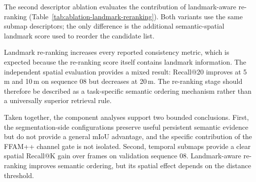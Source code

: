 The second descriptor ablation evaluates the contribution of landmark-aware re-ranking (Table~\ref{tab:ablation-landmark-reranking}). Both variants use the same submap descriptors; the only difference is the additional semantic-spatial landmark score used to reorder the candidate list.
\begin{table}[t]
  \centering
  \caption{Ablation of landmark-aware re-ranking. Consistency values are
  averaged across the evaluated SemanticKITTI sequences.}
  \label{tab:ablation-landmark-reranking}
  \small
  \setlength{\tabcolsep}{3.5pt}
  \renewcommand{\arraystretch}{1.08}
\end{table}
Landmark re-ranking increases every reported consistency metric, which is expected because the re-ranking score itself contains landmark information. The independent spatial evaluation provides a mixed result: Recall@20 improves at 5\,m and 10\,m on sequence 08 but decreases at 20\,m. The re-ranking stage should therefore be described as a task-specific semantic ordering mechanism rather than a universally superior retrieval rule.

Taken together, the component analyses support two bounded conclusions. First, the segmentation-side configurations preserve useful persistent semantic evidence but do not provide a general mIoU advantage, and the specific contribution of the FFAM++ channel gate is not isolated. Second, temporal submaps provide a clear spatial Recall@K gain over frames on validation sequence 08. Landmark-aware re-ranking improves semantic ordering, but its spatial effect depends on the distance threshold.

